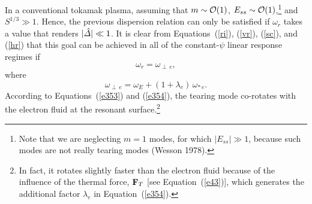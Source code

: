 \documentclass[notitlepage,12pt]{article}
\begin{document}
In a conventional tokamak plasma, assuming that $m\sim {\cal O}(1)$, $E_{ss}\sim {\cal O}(1)$,\footnote{Note that we are neglecting $m=1$ modes, for which $|E_{ss}|\gg 1$,
because such modes are not really tearing modes
(Wesson 1978).} and $S^{1/3}\gg 1$. Hence, the previous dispersion relation can only be satisfied if $\omega_r$ takes a
value that renders $|\hat{\mit\Delta}|\ll 1$. It is clear from Equations~(\ref{ri}), (\ref{vr}), (\ref{sc}), and (\ref{hr}) that this goal
can be achieved in all of the constant-$\psi$ linear response regimes if
\begin{equation}\label{e353}
\omega_r = \omega_{\perp\,e},
\end{equation}
where
\begin{equation}\label{e354}
\omega_{\perp\,e} = \omega_E+(1+\lambda_e)\,\omega_{\ast\,e}.
\end{equation}
According to Equations~(\ref{e353}) and (\ref{e354}), the tearing mode co-rotates with the electron fluid at the resonant
 surface.\footnote{In fact, it
rotates slightly faster than the electron fluid because of the influence of the thermal force, ${\bf F}_T$ [see Equation~(\ref{e43})],
which generates the additional  factor $\lambda_e$ in Equation~(\ref{e354}).}
\end{document}
